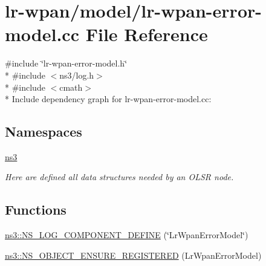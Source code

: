 \hypertarget{lr-wpan-error-model_8cc}{}\section{lr-\/wpan/model/lr-\/wpan-\/error-\/model.cc File Reference}
\label{lr-wpan-error-model_8cc}
{\ttfamily \#include \char`\"{}lr-\/wpan-\/error-\/model.\+h\char`\"{}}\\*
{\ttfamily \#include $<$ns3/log.\+h$>$}\\*
{\ttfamily \#include $<$cmath$>$}\\*
Include dependency graph for lr-\/wpan-\/error-\/model.cc\+:
\subsection*{Namespaces}
\begin{DoxyCompactItemize}
\item 
 \hyperlink{namespacens3}{ns3}
\begin{DoxyCompactList}\small\item\em Here are defined all data structures needed by an O\+L\+SR node. \end{DoxyCompactList}\end{DoxyCompactItemize}
\subsection*{Functions}
\begin{DoxyCompactItemize}
\item 
\hyperlink{namespacens3_a0ed2981f307fac273186c73609d11c9c}{ns3\+::\+N\+S\+\_\+\+L\+O\+G\+\_\+\+C\+O\+M\+P\+O\+N\+E\+N\+T\+\_\+\+D\+E\+F\+I\+NE} (\char`\"{}Lr\+Wpan\+Error\+Model\char`\"{})
\item 
\hyperlink{namespacens3_a17f3a67b9228663a677e9f9521fa66a6}{ns3\+::\+N\+S\+\_\+\+O\+B\+J\+E\+C\+T\+\_\+\+E\+N\+S\+U\+R\+E\+\_\+\+R\+E\+G\+I\+S\+T\+E\+R\+ED} (Lr\+Wpan\+Error\+Model)
\end{DoxyCompactItemize}
